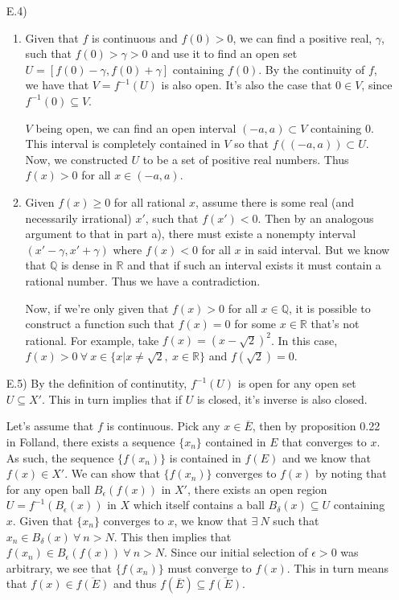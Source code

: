 \documentclass[11pt,letter]{article}
\begin{document}
\begin{enumerate}
    \item[E.4)] 
    \begin{enumerate} 
        \item Given that $f$ is continuous and $f(0) > 0$, we can find a positive real, $\gamma$, such that ${f(0) > \gamma > 0}$ and use it to find an open set $U = [f(0) - \gamma, f(0) + \gamma]$ containing $f(0)$. By the continuity of $f$, we have that $V = f^{-1}(U)$ is also open. It's also the case that $0 \in V$, since $f^{-1}(0) \subseteq V$.

        $V$ being open, we can find an open interval $(-a,a) \subset V$ containing $0$. This interval is completely contained in $V$ so that $f((-a,a)) \subset U$. Now, we constructed $U$ to be a set of positive real numbers. Thus $f(x) > 0$ for all $x \in (-a,a)$.

        \item Given $f(x) \ge 0$ for all rational $x$, assume there is some real (and necessarily irrational) $x'$, such that $f(x') < 0$. Then by an analogous argument to that in part a), there must existe a nonempty interval $(x'-\gamma, x'+\gamma)$ where $f(x) < 0$ for all $x$ in said interval. But we know that $\mathbb{Q}$ is dense in $\mathbb{R}$ and that if such an interval exists it must contain a rational number. Thus we have a contradiction.

        Now, if we're only given that $f(x) > 0$ for all $x \in \mathbb{Q}$, it is possible to construct a function such that $f(x) = 0$ for some $x \in \mathbb{R}$ that's not rational. For example, take $f(x) = (x - \sqrt{2})^2$. In this case, $f(x) > 0 \ \forall \ x \in \{x | x \ne \sqrt{2},\ x \in \mathbb{R}\}$ and $f(\sqrt{2}) = 0$.
    \end{enumerate}

    \item[E.5)] By the definition of continutity, $f^{-1}(U)$ is open for any open set $U \subseteq X'$. This in turn implies that if $U$ is closed, it's inverse is also closed.

    Let's assume that $f$ is continuous. Pick any $x \in \overline{E}$, then by proposition 0.22 in Folland, there exists a sequence $\{x_n\}$ contained in $E$ that converges to $x$. As such, the sequence $\{f(x_n)\}$ is contained in $f(E)$ and we know that $f(x) \in X'$. We can show that $\{f(x_n)\}$ converges to $f(x)$ by noting that for any open ball $B_\epsilon(f(x))$ in $X'$, there exists an open region $U = f^{-1}(B_\epsilon(x))$ in $X$ which itself contains a ball $B_\delta(x) \subseteq U$ containing $x$. Given that $\{x_n\}$ converges to $x$, we know that $\exists\ N$ such that $x_n \in B_\delta(x)\ \forall\ n > N$. This then implies that $f(x_n) \in B_\epsilon(f(x))\ \forall\ n > N$. Since our initial selection of $\epsilon > 0$ was arbitrary, we see that $\{f(x_n)\}$ must converge to $f(x)$. This in turn means that $f(x) \in \overline{f(E)}$ and thus $f(\overline{E}) \subseteq \overline{f(E)}$.


\end{enumerate}
\end{document}
